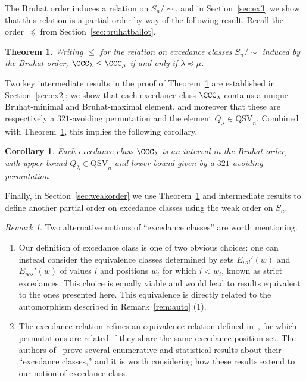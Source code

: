 \documentclass[12pt]{amsart}
\newcommand{\Nantel}[1]{\todo[size=\tiny,inline,color=blue!30]{#1 \\ \hfill --- Nantel}}
\newtheorem{thm}[equation]{Theorem}
\newtheorem{cor}[equation]{Corollary}
\theoremstyle{definition}
\theoremstyle{remark}
\newtheorem{rem}[equation]{Remark}
\numberwithin{equation}{section}
\newcommand{\QSV}{\mathrm{QSV}}
\newcommand{\EP}{E_{pos}}
\newcommand{\EV}{E_{val}}
\begin{document}
The Bruhat order induces a relation on $S_{n}/\!\!\sim$, and in Section~\ref{sec:ex3} we show that this relation is a partial order by way of the following result.  Recall the order $\preceq$ from Section~\ref{sec:bruhatballot}.

\begin{thm}
\label{thm:excedancequotient}
Writing $\le$ for the relation on excedance classes $S_{n}\big/\!\! \sim$ induced by the Bruhat order, $\CCC_{\lambda} \le \CCC_{\mu}$ if and only if $\lambda \preceq \mu$.
\end{thm}

Two key intermediate results in the proof of Theorem~\ref{thm:excedancequotient} are established in Section~\ref{sec:ex2}: we show that each excedance class $\CCC_{\lambda}$ contains a unique Bruhat-minimal and Bruhat-maximal element, and moreover that these are respectively a $321$-avoiding permutation and the element $Q_{\lambda} \in \QSV_{n}$.  Combined with Theorem~\ref{thm:excedancequotient}, this implies the following corollary.  

\begin{cor}\label{cor:interval}
Each excedance class $\CCC_{\lambda}$ is an interval in the Bruhat order, with upper bound $Q_{\lambda}\in \QSV_n$ and lower bound given by a $321$-avoiding permutation
\end{cor}

Finally, in Section~\ref{sec:weakorder} we use Theorem~\ref{thm:excedancequotient} and intermediate results to define another partial order on excedance classes using the weak order on $S_{n}$.


\begin{rem}
\label{rem:altECs}
Two alternative notions of ``excedance classes'' are worth mentioning.
\begin{enumerate}
\item Our definition of excedance class is one of two obvious choices: one can instead consider the equivalence classes determined by sets $\EV'(w)$ and $\EP'(w)$ of values $i$ and positions $w_{i}$ for which $i < w_{i}$, known as strict excedances.  
This choice is equally viable and would lead to results equivalent to the ones presented here.  This equivalence is directly  related to the automorphism described in Remark~\ref{rem:auto} (1).

\item The excedance relation refines an equivalence relation defined in~\cite{ES}, for which permutations are related if they share the same excedance position set.  
The authors of~\cite{ES} prove several enumerative and statistical results about their ``excedance classes,'' and it is worth considering how these results extend to our notion of excedance class.  
%

\end{enumerate}
\end{rem}
\end{document}
